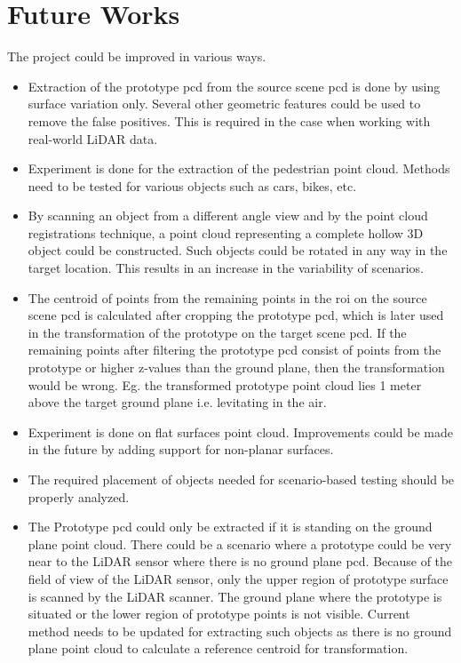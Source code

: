 \section{Future Works}
The project could be improved in various ways.
\begin{itemize}
    \item Extraction of the prototype \acrshort{pcd} from the source scene \acrshort{pcd} is done by using surface variation only. Several other geometric features could be used to remove the false positives. This is required in the case when working with real-world LiDAR data.
    \item Experiment is done for the extraction of the pedestrian point cloud. Methods need to be tested for various objects such as cars, bikes, etc.
    \item By scanning an object from a different angle view and by the point cloud registrations technique, a point cloud representing a complete hollow 3D object could be constructed. Such objects could be rotated in any way in the target location. This results in an increase in the variability of scenarios.
    \item The centroid of points from the remaining points in the \acrshort{roi} on the source scene \acrshort{pcd} is calculated after cropping the prototype \acrshort{pcd}, which is later used in the transformation of the prototype on the target scene \acrshort{pcd}. If the remaining points after filtering the prototype \acrshort{pcd} consist of points from the prototype or higher z-values than the ground plane, then the transformation would be wrong. Eg. the transformed prototype point cloud lies 1 meter above the target ground plane i.e. levitating in the air.
    \item Experiment is done on flat surfaces point cloud. Improvements could be made in the future by adding support for non-planar surfaces.
    \item The required placement of objects needed for scenario-based testing should be properly analyzed.
    \item The Prototype \acrshort{pcd} could only be extracted if it is standing on the ground plane point cloud. There could be a scenario where a prototype could be very near to the LiDAR sensor where there is no ground plane \acrshort{pcd}. Because of the field of view of the LiDAR sensor, only the upper region of prototype surface is scanned by the LiDAR scanner. The ground plane where the prototype is situated or the lower region of prototype points is not visible. Current method needs to be updated for extracting such objects as there is no ground plane point cloud to calculate a reference centroid for transformation.

\end{itemize}
